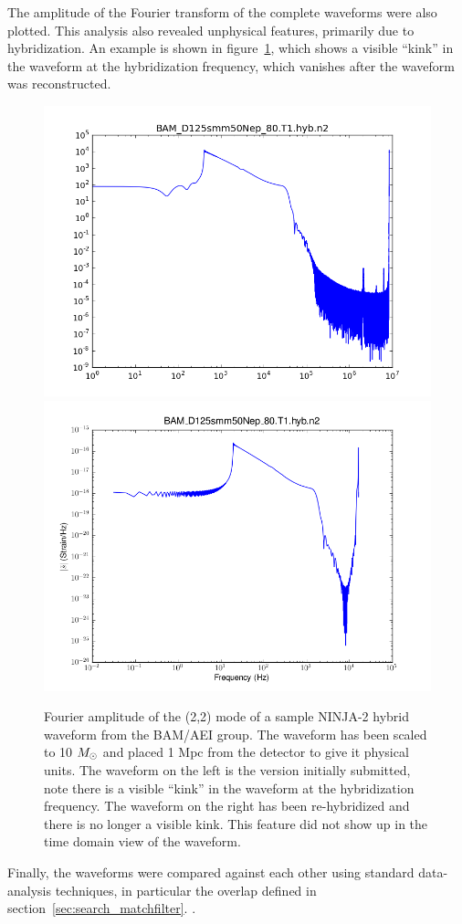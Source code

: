 The amplitude of the Fourier transform of the complete waveforms were
also plotted.  This analysis also revealed unphysical features, 
primarily due to hybridization.  An example is shown in
figure~\ref{f:ninja2_freq_hybrids}, which shows a visible ``kink'' in
the waveform at the hybridization frequency, which vanishes after the
waveform was reconstructed.

\begin{figure}
  \includegraphics[width=0.5\linewidth]{figures/ninja2/bam_d125smm50nep_80_t1_hyb_n2_amp.png}
  \includegraphics[width=0.5\linewidth]{figures/ninja2/bam_d125smm50nep_80_t1_hyb_n2_amp_v2.png}
  \caption[Frequency-domain hybrid NINJA-2 waveforms]{
  \label{f:ninja2_freq_hybrids}
Fourier amplitude of the (2,2) mode of a sample NINJA-2 hybrid
waveform from the BAM/AEI group.  The waveform has been scaled to 10
$M_\odot$ and placed 1 Mpc from the detector to give it physical units.
 The waveform on the left is the version
initially submitted, note there is a visible ``kink'' in the waveform
at the hybridization frequency.  The waveform on the right has been
re-hybridized and there is no longer a visible kink.  This feature did
not show up in the time domain view of the waveform.}
\end{figure}%

Finally, the waveforms were compared against each other using standard
data-analysis techniques, in particular the overlap defined in
section~\ref{sec:search_matchfilter}. .

